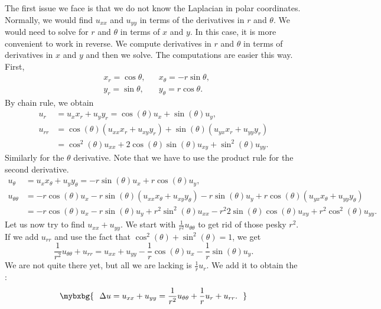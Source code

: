 The first issue we face is that we do not know the Laplacian
in polar coordinates.
Normally, we would find $u_{xx}$ and $u_{yy}$ in terms of
the derivatives in $r$ and $\theta$.  We would need to solve
for $r$ and $\theta$ in terms of $x$ and $y$.  In this case,
it is more convenient to work in
reverse.  We compute derivatives in $r$ and $\theta$ in terms
of derivatives in $x$ and $y$ and then we solve.  The
computations are easier this way.  First,
\begin{equation*}
\begin{aligned}
& x_r = \cos \theta, & &
x_\theta = - r \sin \theta, \\
& y_r = \sin \theta, & &
y_\theta = r \cos \theta.
\end{aligned}
\end{equation*}
By chain rule, we obtain
\begin{align*}
u_r & = u_x x_r + u_y y_r = \cos(\theta) u_x + \sin(\theta) u_y ,
\\
u_{rr} & =
\cos(\theta) ( u_{xx} x_r +u_{xy} y_r )
+ \sin(\theta) ( u_{yx} x_r +u_{yy} y_r )
\\
&
=
\cos^2(\theta) u_{xx} +
2 \cos(\theta)\sin(\theta) u_{xy} +
\sin^2(\theta) u_{yy} .
\end{align*}
Similarly for the $\theta$ derivative.  Note that we have to use
the product rule for the second derivative.
\begin{align*}
u_\theta & = u_x x_\theta + u_y y_\theta =
-r\sin(\theta) u_x + r\cos(\theta) u_y ,
\\
u_{\theta\theta} & =
-r\cos(\theta) u_x
-r\sin(\theta) (u_{xx} x_\theta + u_{xy} y_\theta)
-r\sin(\theta) u_y
+
r\cos(\theta) (u_{yx} x_\theta + u_{yy} y_\theta)
\\
& = 
-r\cos(\theta) u_x
-r\sin(\theta) u_y
+r^2 \sin^2(\theta) u_{xx}
-r^2 2\sin(\theta)\cos(\theta) u_{xy}
+r^2 \cos^2(\theta) u_{yy} .
\end{align*}
Let us now try to find $u_{xx} + u_{yy}$.  We start with
$\frac{1}{r^2} u_{\theta\theta}$ to get rid of those pesky $r^2$.
If we add $u_{rr}$
and use the fact that $\cos^2(\theta) +\sin^2(\theta) = 1$, we get
\begin{equation*}
\frac{1}{r^2} u_{\theta\theta}
+
u_{rr}
=
u_{xx} + u_{yy} - \frac{1}{r} \cos(\theta) u_x - \frac{1}{r} \sin(\theta)
u_y .
\end{equation*}
We are not quite there yet, but all we are lacking is 
$\frac{1}{r} u_r$.  We add it to obtain the
\emph{}:
\begin{equation*}
\mybxbg{~~
\Delta u 
=
u_{xx} + u_{yy} =
\frac{1}{r^2} u_{\theta\theta}
+
\frac{1}{r} u_{r}
+
u_{rr} .
~~}
\end{equation*}

